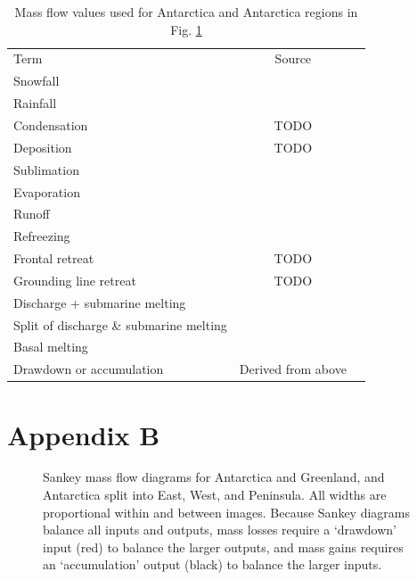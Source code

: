 \documentclass[jog]{igs}
\begin{document}
\begin{table}
\caption{Mass flow values used for Antarctica and Antarctica regions in Fig. \ref{fig}}
\label{tab:aq}
\begin{tabular}{@{}lcc}\hline
  Term & Source\\
  Snowfall & \citet{fettweis_2020}\\
  Rainfall & \citet{fettweis_2020}\\
  Condensation & TODO\\
  Deposition & TODO\\
  Sublimation & \citet{fettweis_2020}\\
  Evaporation & \citet{fettweis_2020}\\
  Runoff & \citet{fettweis_2020}\\
  Refreezing & \citet{fettweis_2020}\\
  Frontal retreat & TODO\\
  Grounding line retreat & TODO\\
  Discharge + submarine melting & \citet{davison_2023}\\
  Split of discharge \& submarine melting & \citet{davison_2023}\\
  Basal melting & \citet{van-liefferinge_2013}\\
  Drawdown or accumulation & Derived from above
\end{tabular}
\end{table}

\section{Appendix B}
\label{sec:appendix:B}

\begin{figure}
\caption{Sankey mass flow diagrams for Antarctica and Greenland, and Antarctica split into East, West, and Peninsula. All widths are proportional within and between images. Because Sankey diagrams balance all inputs and outputs, mass losses require a `drawdown' input (red) to balance the larger outputs, and mass gains requires an `accumulation' output (black) to balance the larger inputs.}
\label{fig}
\end{figure}
\end{document}
